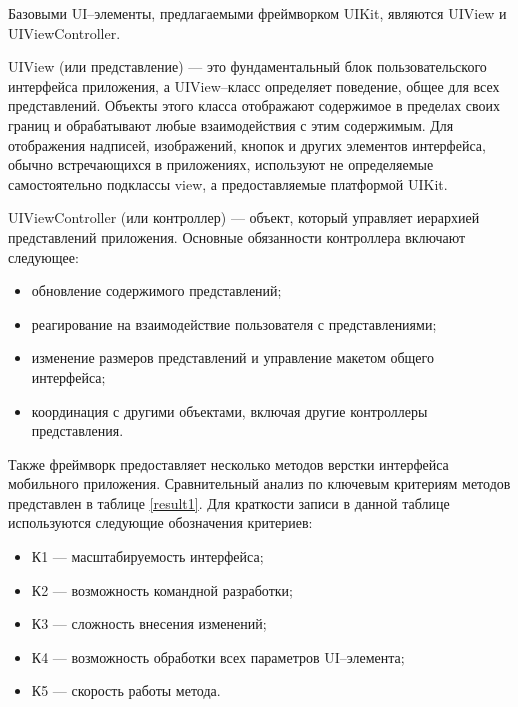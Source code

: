 Базовыми UI--элементы, предлагаемыми фреймворком UIKit, являются UIView и UIViewController. 

UIView (или представление) \cite{uiview} --- это фундаментальный блок пользовательского интерфейса приложения, а UIView--класс определяет поведение, общее для всех представлений. Объекты этого класса отображают содержимое в пределах своих границ и обрабатывают любые взаимодействия с этим содержимым. Для отображения надписей, изображений, кнопок и других элементов интерфейса, обычно встречающихся в приложениях, используют не определяемые самостоятельно подклассы view, а предоставляемые платформой UIKit.  

UIViewController (или контроллер) \cite{controller} --- объект, который управляет иерархией представлений приложения. Основные обязанности контроллера включают следующее:

\begin{itemize}[label=---]
	\item обновление содержимого представлений;
	\item реагирование на взаимодействие пользователя с представлениями;
	\item изменение размеров представлений и управление макетом общего интерфейса;
	\item координация с другими объектами, включая другие контроллеры представления.
\end{itemize}

Также фреймворк предоставляет несколько методов верстки интерфейса мобильного приложения. Сравнительный анализ по ключевым критериям методов представлен в таблице \ref{result1}. 
Для краткости записи в данной таблице используются следующие обозначения критериев:

 \begin{itemize}[label=---]
	\item К1 --- масштабируемость интерфейса;
	\item К2 --- возможность командной разработки;
	\item К3 --- сложность внесения изменений;
	\item К4 --- возможность обработки всех параметров UI--элемента;
	\item К5 --- скорость работы метода.
\end{itemize}


